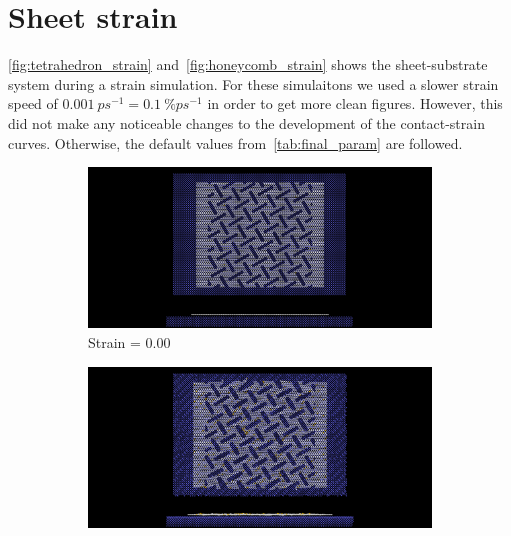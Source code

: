 \chapter{Sheet strain}\label{sec:sheet_stretch}

\cref{fig:tetrahedron_strain} and~\cref{fig:honeycomb_strain} shows the sheet-substrate system during a strain simulation. For these simulaitons we used a slower strain speed of $\SI{0.001}{ps^{-1}} = \SI{0.1}{\%ps^{-1}}$ in order to get more clean figures. However, this did not make any noticeable changes to the development of the contact-strain curves. Otherwise, the default values from~\cref{tab:final_param} are followed.


\newpage



\begin{figure}[H]
    \centering
    \begin{subfigure}[b]{0.49\textwidth}
        \centering
        \includegraphics[width=\textwidth]{figures/baseline/contact_vs_stretch/popup/pop_stretch0000.png}
        \caption{Strain = 0.00}
    \end{subfigure}
    \hfill
    \begin{subfigure}[b]{0.49\textwidth}
        \centering
        \includegraphics[width=\textwidth]{figures/baseline/contact_vs_stretch/popup/pop_stretch0006.png}

\end{subfigure}
\end{figure}
